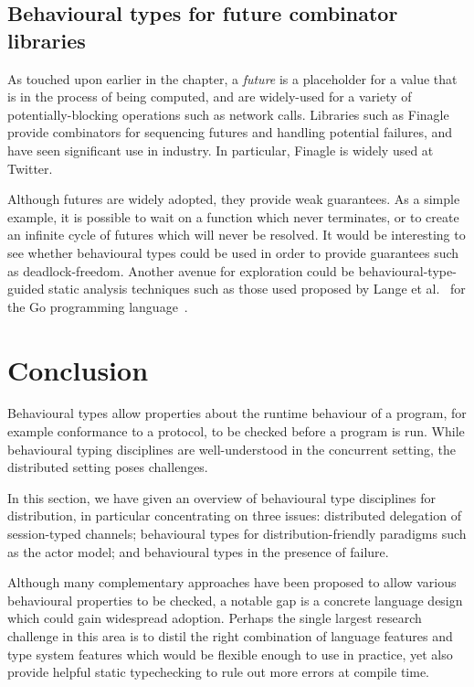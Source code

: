 \documentclass[
graybox,
envcountchap
]{svmult}
\begin{document}
\begin{bibunit}
  \subsection{Behavioural types for future combinator libraries}
  As touched upon earlier in the chapter, a \emph{future} is a placeholder for a
  value that is in the process of being computed, and are widely-used for a
  variety of potentially-blocking operations such as network calls. Libraries
  such as Finagle~\cite{finagle} provide combinators for sequencing futures and
  handling potential failures, and have seen significant use in industry. In
  particular, Finagle is widely used at Twitter.

  Although futures are widely adopted, they provide weak guarantees. As a simple
  example, it is possible to wait on a function which never terminates, or to
  create an infinite cycle of futures which will never be resolved.
  It would be interesting to see whether behavioural types could be used in
  order to provide guarantees such as deadlock-freedom. Another avenue for
  exploration could be behavioural-type-guided static analysis techniques such
  as those used proposed by Lange et al.~\cite{LangeNTY17:fencing-off-go} for
  the Go programming language~\cite{DonovanK15:go}.

  \section{Conclusion}\label{sec:bt:conclusion}

  Behavioural types allow properties about the runtime behaviour of a program,
  for example conformance to a protocol, to be checked before a program is run.
  While behavioural typing disciplines are well-understood in the concurrent
  setting, the distributed setting poses challenges.

  In this section, we have given an overview of behavioural type disciplines for
  distribution, in particular concentrating on three issues: distributed
  delegation of session-typed channels; behavioural types for
  distribution-friendly paradigms such as the actor model; and behavioural types
  in the presence of failure.

  Although many complementary approaches have been proposed to allow various
  behavioural properties to be checked, a notable gap is a concrete language
  design which could gain widespread adoption. Perhaps the single largest
  research challenge in this area is to distil the right combination of language
  features and type system features which would be flexible enough to use in
  practice, yet also provide helpful static typechecking to rule out more errors
  at compile time.


\end{bibunit}
\end{document}
